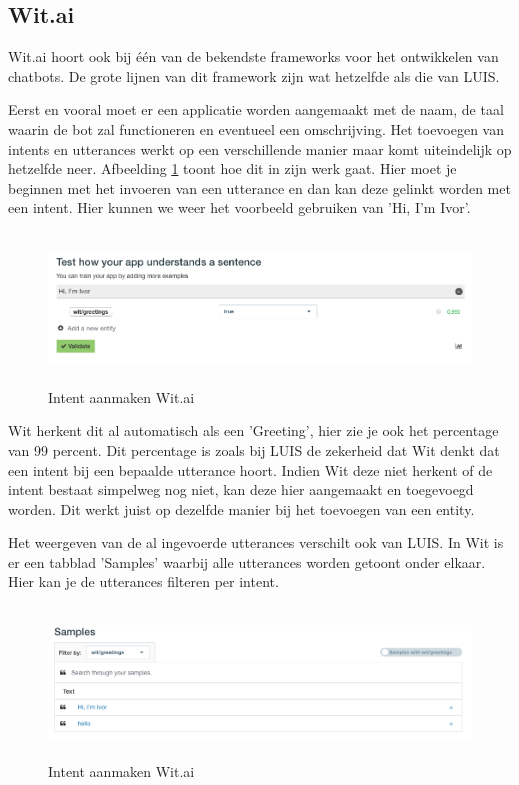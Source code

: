 \subsection{Wit.ai}
\label{Wit}

Wit.ai hoort ook bij één van de bekendste frameworks voor het ontwikkelen van chatbots. De grote lijnen van dit framework zijn wat hetzelfde als die van LUIS.

Eerst en vooral moet er een applicatie worden aangemaakt met de naam, de taal waarin de bot zal functioneren en eventueel een omschrijving. Het toevoegen van intents en utterances werkt op een verschillende manier maar komt uiteindelijk op hetzelfde neer. Afbeelding \ref{fig:intentsWit} toont hoe dit in zijn werk gaat. Hier moet je beginnen met het invoeren van een utterance en dan kan deze gelinkt worden met een intent. Hier kunnen we weer het voorbeeld gebruiken van 'Hi, I'm Ivor'.

\begin{figure}[h!]
	\centering
	\includegraphics[height=4cm]{img/wit_intents.png}
	\caption{Intent aanmaken Wit.ai}
	\label{fig:intentsWit}
\end{figure}

Wit herkent dit al automatisch als een 'Greeting', hier zie je ook het percentage van 99 percent. Dit percentage is zoals bij LUIS de zekerheid dat Wit denkt dat een intent bij een bepaalde utterance hoort. Indien Wit deze niet herkent of de intent bestaat simpelweg nog niet, kan deze hier aangemaakt en toegevoegd worden. Dit werkt juist op dezelfde manier bij het toevoegen van een entity.

Het weergeven van de al ingevoerde utterances verschilt ook van LUIS. In Wit is er een tabblad 'Samples' waarbij alle utterances worden getoont onder elkaar. Hier kan je de utterances filteren per intent.

\begin{figure}[h!]
	\centering
	\includegraphics[height=4cm]{img/samples.png}
	\caption{Intent aanmaken Wit.ai}
	\label{fig:samples}
\end{figure}

